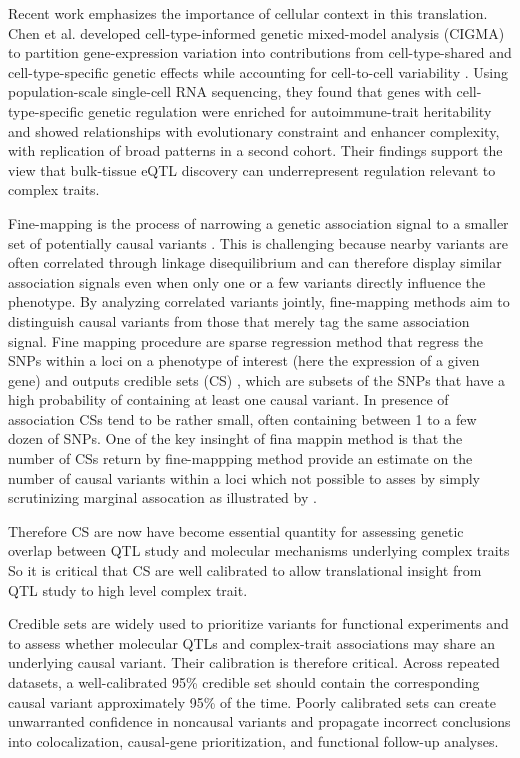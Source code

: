 \documentclass[12pt]{article}
\begin{document}
Recent work emphasizes the importance of cellular context in this
translation. Chen et al. developed cell-type-informed genetic
mixed-model analysis (CIGMA) to partition gene-expression variation
into contributions from cell-type-shared and cell-type-specific
genetic effects while accounting for cell-to-cell variability
\cite{chen_cell_type_specific_2026}. Using population-scale single-cell
RNA sequencing, they found that genes with cell-type-specific genetic
regulation were enriched for autoimmune-trait heritability and showed
relationships with evolutionary constraint and enhancer complexity,
with replication of broad patterns in a second cohort. Their findings
support the view that bulk-tissue eQTL discovery can underrepresent
regulation relevant to complex traits.



Fine-mapping is the process of narrowing a genetic association signal
to a smaller set of potentially causal variants
\cite{schaid_genome-wide_2018}. This is challenging because nearby
variants are often correlated through linkage disequilibrium and can
therefore display similar association signals even when only one or a
few variants directly influence the phenotype. By analyzing correlated
variants jointly, fine-mapping methods aim to distinguish causal
variants from those that merely tag the same association signal.  Fine mapping procedure are sparse regression method that  regress the SNPs within a loci on a phenotype of interest (here the expression of a given gene) and outputs credible sets (CS) \cite{maller_bayesian_2012}, which are subsets of the SNPs that have a high probability of containing at least one causal variant. In presence of association CSs tend to be rather small, often  containing between 1 to a few dozen of SNPs. One of the key insinght of fina mappin method is that the number of CSs return by fine-mappping method provide an estimate on the number of  causal variants within a loci which  not possible to asses by simply scrutinizing marginal assocation as illustrated by \cite{wang_simple_2020}.

Therefore CS are now have become essential quantity for assessing genetic overlap between QTL study and molecular mechanisms underlying complex traits  So it is critical that CS are well calibrated to allow translational insight from QTL study to high level complex trait.

Credible sets are widely used to prioritize variants for functional
experiments and to assess whether molecular QTLs and complex-trait
associations may share an underlying causal variant. Their calibration
is therefore critical. Across repeated datasets, a well-calibrated
95\% credible set should contain the corresponding causal variant
approximately 95\% of the time. Poorly calibrated sets can create
unwarranted confidence in noncausal variants and propagate incorrect
conclusions into colocalization, causal-gene prioritization, and
functional follow-up analyses.
\end{document}
